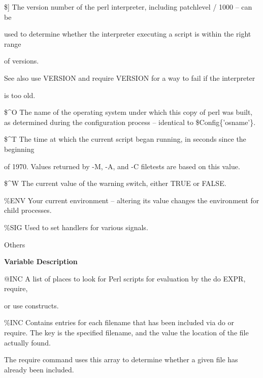 \documentclass[a4paper,11pt]{book}
\begin{document}
\noindent \$] The version number of the perl interpreter, including patchlevel / 1000 -- can be

\noindent used to determine whether the interpreter executing a script is within the right range

\noindent of versions.

\noindent 

\noindent See also use VERSION and require VERSION for a way to fail if the interpreter

\noindent is too old.

\noindent 

\noindent \$\^{}O The name of the operating system under which this copy of perl was built, as determined during the configuration process -- identical to \$Config\{'osname'\}.

\noindent 

\noindent \$\^{}T The time at which the current script began running, in seconds since the beginning

\noindent of 1970. Values returned by -M, -A, and -C filetests are based on this value.

\noindent 

\noindent \$\^{}W The current value of the warning switch, either TRUE or FALSE.

\noindent 

\noindent \%ENV Your current environment -- altering its value changes the environment for child processes.

\noindent 

\noindent \%SIG Used to set handlers for various signals.

\noindent \eject 

\noindent Others

\noindent 

\noindent \textbf{Variable Description}

\noindent 

\noindent @INC A list of places to look for Perl scripts for evaluation by the do EXPR, require,

\noindent or use constructs.

\noindent 

\noindent \%INC Contains entries for each filename that has been included via do or require. The key is the specified filename, and the value the location of the file actually found.

\noindent The require command uses this array to determine whether a given file has already been included.
\end{document}
